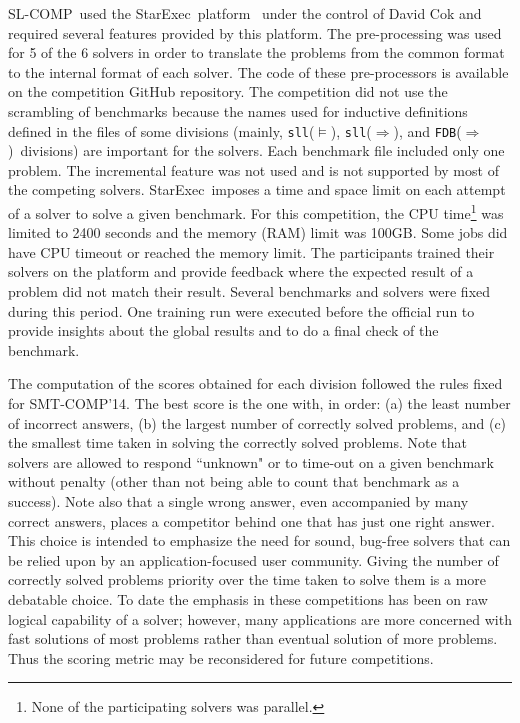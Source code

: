 \documentclass[twoside,11pt]{article}
\newcommand{\limp}{\Rightarrow}
\newcommand{\sllsat}{\texttt{sll}($\models$)}
\newcommand{\sllent}{\texttt{sll}($\limp$)}
\newcommand{\FDBent}{\texttt{FDB}($\limp$)}
\newcommand{\smtcomp}{\textsf{SMT-COMP}}
\newcommand{\slcomp}{\textsf{SL-COMP}}
\newcommand{\starexec}{\textsf{StarExec}}
\begin{document}
\slcomp\ used the \starexec\ platform~\cite{StarExecsite} under the control of David Cok 
and required several features provided by this platform.
%
The pre-processing was used for 5 of the 6 solvers in order to translate the problems from the common format to the internal format of each solver. The code of these pre-processors is available on the competition GitHub repository.
%
The competition did not use the scrambling of benchmarks because the names used for inductive definitions defined in the files of some divisions (mainly, \sllsat, \sllent, and \FDBent\ divisions) are important for the solvers.
%
Each benchmark file included only one problem. 
The incremental feature was not used and is not supported by most of the competing solvers.
%
\starexec\ imposes a time and space limit on each attempt of a solver to solve a given benchmark. For this competition, the CPU time\footnote{None of the participating solvers was parallel.} was limited to 2400 seconds and
the memory (RAM) limit was 100GB. 
Some jobs did have CPU timeout or reached the memory limit.
%
The participants trained their solvers on the platform and provide feedback where the expected result of a problem did not match their result. Several benchmarks and solvers were fixed during this period.
One training run were executed before the official run to provide insights about the global results and to do a final check of the benchmark.

The computation of the scores obtained for each division followed the rules fixed for \smtcomp'14.
The best score is the one with, in order:
(a) the least number of incorrect answers, 
(b) the largest number of correctly solved problems, and 
(c) the smallest time taken in solving the correctly solved problems.
%
Note that solvers are allowed to respond ``unknown" or to time-out on a given benchmark without penalty (other than not being able to count that benchmark as a success).
Note also that a single wrong answer, even accompanied by many correct answers, places a competitor behind one that has just one right answer. This choice is intended to emphasize the need for sound, bug-free solvers that can be relied upon by an application-focused user community. 
%
Giving the number of correctly
solved problems priority over the time taken to solve them is a more debatable choice. To date the emphasis in these competitions has been on raw logical capability of a solver; however, many applications are more concerned with fast solutions of most problems rather than eventual solution of more problems. Thus the scoring metric may be reconsidered for future competitions.
\end{document}
